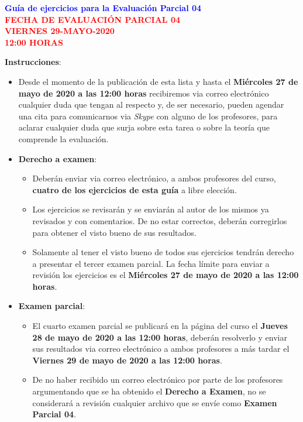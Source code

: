 \documentclass[10pt]{report}
\numberwithin{section}{chapter}
\begin{document}
\begin{center}
\textcolor{blue}{\textbf{\large Guía de ejercicios para la Evaluación Parcial 04}}\\
\vspace{0.5 cm}
\textcolor{red}{\textbf{\large FECHA DE EVALUACIÓN PARCIAL 04 \\ VIERNES 29-MAYO-2020\\ 12:00 HORAS}}
\end{center}

\textbf{Instrucciones}: 
\begin{itemize}
\item Desde el momento de la publicación de esta lista y hasta el \textbf{Miércoles 27 de mayo de 2020 a las 12:00 horas} recibiremos via correo electrónico cualquier duda que tengan al respecto y, de ser necesario, pueden agendar una cita para comunicarnos via {\it Skype} con alguno de los profesores, para aclarar cualquier duda que surja sobre esta tarea o sobre la teoría que comprende la evaluación.

\item \textbf{Derecho a examen}:
\begin{itemize}
\item Deberán enviar via correo electrónico, a ambos profesores del curso, \textbf{cuatro de los ejercicios de esta guía} a libre elección.

\item Los ejercicios se revisarán y se enviarán al autor de los mismos ya revisados y con comentarios. De no estar correctos, deberán corregirlos para obtener el visto bueno de sus resultados.

\item Solamente al tener el visto bueno de todos sus ejercicios tendrán derecho a presentar el tercer examen parcial. La fecha límite para enviar a revisión los ejercicios es el \textbf{Miércoles 27 de mayo de 2020 a las 12:00 horas}.
\end{itemize}

\item \textbf{Examen parcial}:
\begin{itemize}
\item El cuarto examen parcial se publicará en la página del curso el \textbf{Jueves 28 de mayo de 2020 a las 12:00 horas}, deberán resolverlo y enviar sus resultados via correo electrónico a ambos profesores a más tardar el \textbf{Viernes 29 de mayo de 2020 a las 12:00 horas}.

\item De no haber recibido un correo electrónico por parte de los profesores argumentando que se ha obtenido el \textbf{Derecho a Examen}, no se considerará a revisión cualquier archivo que se envíe como \textbf{Examen Parcial 04}.
\end{itemize}
\end{itemize}
\end{document}
